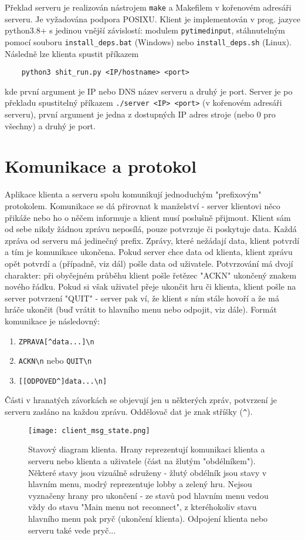 \documentclass{article}
\begin{document}
Překlad serveru je realizován nástrojem \verb|make| a Makefilem v kořenovém adresáři serveru. Je vyžadována podpora POSIXU. Klient je implementován v prog. jazyce python3.8+ s jedinou vnější závislostí: modulem \verb|pytimedinput|, stáhnutelným pomocí souboru \verb|install_deps.bat| (Windows) nebo \verb|install_deps.sh| (Linux). Následně lze klienta spustit příkazem 
\begin{verbatim}
    python3 shit_run.py <IP/hostname> <port>
\end{verbatim}
kde první argument je IP nebo DNS název serveru a druhý je port. Server je po překladu spustitelný příkazem \verb|./server <IP> <port>| (v kořenovém adresáři serveru), první argument je jedna z dostupných IP adres stroje (nebo 0 pro všechny) a druhý je port.

\section{Komunikace a protokol}

Aplikace klienta a serveru spolu komunikují jednoduchým "prefixovým" protokolem. Komunikace se dá přirovnat k manželství - server klientovi něco přikáže nebo ho o něčem informuje a klient musí poslušně přijmout. Klient sám od sebe nikdy žádnou zprávu neposílá, pouze potvrzuje či poskytuje data. Každá zpráva od serveru má jedinečný prefix. Zprávy, které nežádají data, klient potvrdí a tím je komunikace ukončena. Pokud server chce data od klienta, klient zprávu opět potvrdí a (případně, viz dál) pošle data od uživatele. Potvrzování má dvojí charakter: při obyčejném průběhu klient pošle řetězec "ACKN" ukončený znakem nového řádku. Pokud si však uživatel přeje ukončit hru či klienta, klient pošle na server potvrzení "QUIT" - server pak ví, že klient s ním stále hovoří a že má hráče ukončit (buď vrátit to hlavního menu nebo odpojit, viz dále). Formát komunikace je následovný:

\begin{enumerate}
    \item \verb-ZPRAVA[^data...]\n-
    \item \verb-ACKN\n- nebo \verb-QUIT\n-
    \item \verb-[[ODPOVED^]data...\n]-
\end{enumerate}
Části v hranatých závorkách se objevují jen u některých zpráv, potvrzení je serveru zasláno na každou zprávu. Oddělovač dat je znak stříšky (\verb-^-).

\begin{figure}
    \centering
    \texttt{[image: client\_msg\_state.png]}
    \caption{Stavový diagram klienta. Hrany reprezentují komunikaci klienta a serveru nebo klienta a uživatele (část na žlutým "obdélníkem"). Některé stavy jsou vizuálně sdruženy - žlutý obdélník jsou stavy v hlavním menu, modrý reprezentuje lobby a zelený hru. Nejsou vyznačeny hrany pro ukončení - ze stavů pod hlavním menu vedou vždy do stavu "Main menu not reconnect", z kteréhokoliv stavu hlavního menu pak pryč (ukončení klienta). Odpojení klienta nebo serveru také vede pryč... }
    \label{fig:client-states}
\end{figure}
\end{document}

